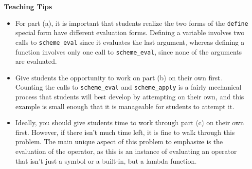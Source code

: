 \begin{guide}
\begin{blocksection}
\textbf{Teaching Tips}
	\begin{itemize}
		\item For part (a), it is important that students realize the two forms of the \lstinline{define} special form have different evaluation forms. Defining a variable involves two calls to \lstinline$scheme_eval$ since it evaluates the last argument, whereas defining a function involves only one call to \lstinline$scheme_eval$, since none of the arguments are evaluated.
		\item Give students the opportunity to work on part (b) on their own first. Counting the calls to \lstinline$scheme_eval$ and \lstinline$scheme_apply$ is a fairly mechanical process that students will best develop by attempting on their own, and this example is small enough that it is manageable for students to attempt it.
		\item Ideally, you should give students time to work through part (c) on their own first. However, if there isn't much time left, it is fine to walk through this problem. The main unique aspect of this problem to emphasize is the evaluation of the operator, as this is an instance of evaluating an operator that isn't just a symbol or a built-in, but a lambda function.
	\end{itemize}
\end{blocksection}
\end{guide}
		